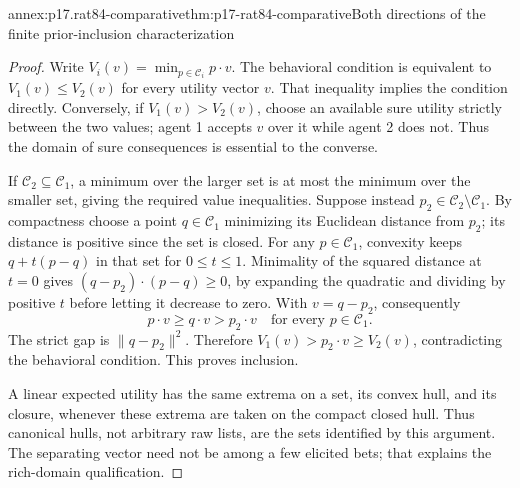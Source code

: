 \begin{annexitem}{annex:p17.rat84-comparative}{thm:p17-rat84-comparative}{Both directions of the finite prior-inclusion characterization}
\begin{proof}
Write \(V_i(v)=\min_{p\in\mathcal C_i}p\cdot v\).
The behavioral condition is equivalent to \(V_1(v)\leq V_2(v)\)
for every utility vector \(v\). That inequality implies the
condition directly. Conversely, if \(V_1(v)>V_2(v)\), choose
an available sure utility strictly between the two values;
agent 1 accepts \(v\) over it while agent 2 does not.
Thus the domain of sure consequences is essential to the converse.

If \(\mathcal C_2\subseteq\mathcal C_1\), a minimum over
the larger set is at most the minimum over the smaller set,
giving the required value inequalities. Suppose instead
\(p_2\in\mathcal C_2\setminus\mathcal C_1\). By compactness
choose a point \(q\in\mathcal C_1\) minimizing its Euclidean
distance from \(p_2\); its distance is positive since the
set is closed. For any \(p\in\mathcal C_1\), convexity
keeps \(q+t(p-q)\) in that set for \(0\leq t\leq1\).
Minimality of the squared distance at \(t=0\) gives
\((q-p_2)\cdot(p-q)\geq0\), by expanding the quadratic
and dividing by positive \(t\) before letting it decrease
to zero. With \(v=q-p_2\), consequently
\[
 p\cdot v\geq q\cdot v>p_2\cdot v
             \quad\text{for every }p\in\mathcal C_1.
\]
The strict gap is \(\|q-p_2\|^2\). Therefore
\(V_1(v)>p_2\cdot v\geq V_2(v)\), contradicting the
behavioral condition. This proves inclusion.

A linear expected utility has the same extrema on a set,
its convex hull, and its closure, whenever these extrema
are taken on the compact closed hull. Thus canonical hulls,
not arbitrary raw lists, are the sets identified by this
argument. The separating vector need not be among a few
elicited bets; that explains the rich-domain qualification.
\end{proof}
\end{annexitem}

